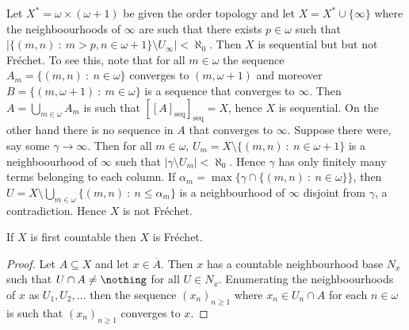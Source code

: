 \documentclass{article}
\newcommand{\seqcl}[1]{{[#1]_{\text{seq}}}}
\begin{document}
 
\begin{exam}
    Let \(X^{\ast} = \omega \times (\omega + 1)\) be given the order topology and let \(X =  X^{\ast} \cup \{\infty\}\) where the neighboourhoods  of \(\infty\) are such that there exists \(p \in \omega\) such that \(|\{(m, n) \: : \: m > p, n \in \omega + 1\} \setminus U_{\infty}| < \aleph_0\). Then \(X\) is sequential but but not Fréchet. To see this, note that for all \(m \in \omega\) the sequence \(A_m = \{(m, n) \: : \: n \in \omega\}\) converges to \((m, \omega + 1)\) and moreover \(B = \{(m, \omega + 1) \: : \: m \in \omega\}\) is a sequence that converges to \(\infty\). Then \(A = \bigcup_{m \in \omega} A_m\) is such that \(\seqcl{\seqcl{A}} = X\), hence \(X\) is sequential. On the other hand there is no sequence in \(A\) that converges to \(\infty\). Suppose there were, say some \(\gamma \to \infty\). Then for all \(m \in \omega\), \(U_m = X \setminus \{(m, n)\: : \: n \in \omega + 1\}\) is a neighboourhood of \(\infty\) such that \(|\gamma \setminus U_m| < \aleph_0\). Hence \(\gamma\) has only finitely many terms belonging to each column. If \(\alpha_m = \max\{\gamma \cap \{(m, n) \: : \: n \in \omega\}\}\), then \(U = X \setminus \bigcup_{m \in \omega} \{(m ,n )\: : \:  n \leq \alpha_m\}\) is a neighbourhood of \(\infty\) disjoint from \(\gamma\), a contradiction. Hence \(X\) is not Fréchet. 
\end{exam} 
\begin{prop}
    If \(X\) is first countable then \(X\) is Fréchet.
\end{prop}
\begin{proof}
    Let \(A \subseteq X\) and let \(x \in \overline{A}\). Then \(x\) has a countable neighbourhood base \(N_x\) such that \(U \cap A \neq \nothing\) for all \(U \in N_x\). Enumerating the neighboourhoods of \(x\) as \(U_1, U_2, \dots\) then the sequence \((x_n)_{n \ge 1}\) where \(x_n \in U_n \cap A\) for each \(n \in \omega\) is such that \((x_n)_{n \ge 1}\) converges to \(x\).
\end{proof}
\end{document}
